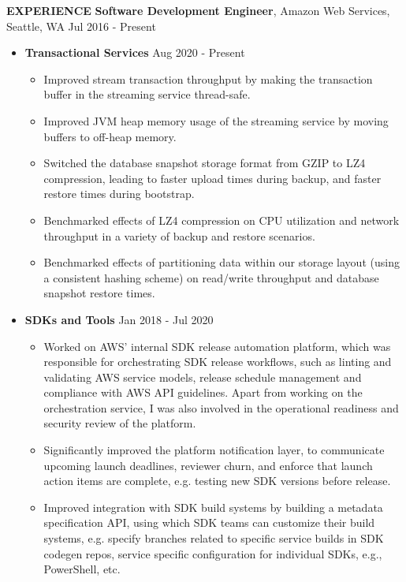 \documentclass[10pt, a4paper]{article}
\begin{document}
\textbf{EXPERIENCE}
\smallskip
\newline
\textbf{Software Development Engineer}, Amazon Web Services, Seattle, WA \hfill Jul 2016 - Present
\begin{itemize}
\item \textbf{Transactional Services} \hfill Aug 2020 - Present
  \begin{itemize}[label=$\bullet$]
  \item Improved stream transaction throughput by making the transaction buffer in the streaming service thread-safe.
  \item Improved JVM heap memory usage of the streaming service by moving buffers to off-heap memory.
  \item Switched the database snapshot storage format from GZIP to LZ4 compression, leading to faster upload times during backup, and faster restore times during bootstrap.    
  \item Benchmarked effects of LZ4 compression on CPU utilization and network throughput in a variety of backup and restore scenarios.
  \item Benchmarked effects of partitioning data within our storage layout (using a consistent hashing scheme) on read/write throughput and database snapshot restore times.
  \end{itemize}
\item \textbf{SDKs and Tools} \hfill Jan 2018 - Jul 2020
  \begin{itemize}[label=$\bullet$]
  \item Worked on AWS' internal SDK release automation platform, which was responsible for orchestrating SDK release workflows, such as linting and validating AWS service models, release schedule management and compliance with AWS API guidelines. Apart from working on the orchestration service, I was also involved in the operational readiness and security review of the platform.
  \item Significantly improved the platform notification layer, to communicate upcoming launch deadlines, reviewer churn, and enforce that launch action items are complete, e.g. testing new SDK versions before release.
  \item Improved integration with SDK build systems by building a metadata specification API, using which SDK teams can customize their build systems, e.g. specify branches related to specific service builds in SDK codegen repos, service specific configuration for individual SDKs, e.g., PowerShell, etc.

\end{itemize}
\end{itemize}
\end{document}
